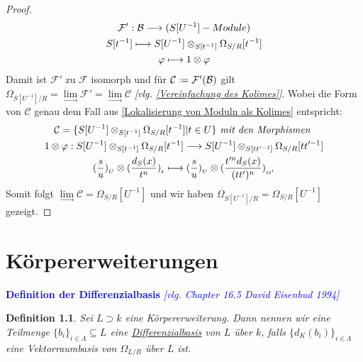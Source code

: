 \documentclass[10pt,a4paper]{report}
\newcommand{\comment}[1]{}
\newcommand{\ModulsOfDifferenzials}{David Eisenbud 1994}
\newcounter{Aussage}[chapter]
\newtheorem{definition}[Aussage]{Definition}
\newcommand{\functionfront}[3]{\nolinebreak{#1:#2 \longrightarrow #3}}
\newcommand{\divR}[2]{\Omega_{#1/#2}}
\newcommand{\divf}[1]{d_{#1}}
\newcommand{\Tensor}[3]{#1 \otimes_{#2} #3}
\newcommand{\tensor}[3]{#1 \otimes #3}
\newcommand{\lok}[2]{#1 [#2^{-1}]}
\newcommand{\loke}[3]{(\frac{#1}{#2})_{_{#3}}}
\newcommand{\colimes}[0]{\lim\limits_{ \longrightarrow }}
\newcommand*{\defeq}{\mathrel{\vcenter{\baselineskip0.5ex \lineskiplimit0pt
                     \hbox{\scriptsize.}\hbox{\scriptsize.}}}%
                     =}
\begin{document}
\begin{proof}
{\begin{gather*}
\functionfront{\mathcal{F'}}{\mathcal{B}}{(\lok{S}{U} - Module)}\\
\lok{S}{t} \longmapsto \Tensor{\lok{S}{U}}{\lok{S}{t}}{\lok{\divR{S}{R}}{t}}\\
\varphi \longmapsto \tensor{1}{\lok{S}{t}}{\varphi}
\end{gather*}}
Damit ist $\mathcal{F'}$ zu $\mathcal{F}$ isomorph und für $\mathcal{C} \defeq \mathcal{F'}(\mathcal{B})$ gilt $\divR{\lok{S}{U}}{R}  = \colimes{\mathcal{F'}} = \colimes{\mathcal{C}}$ \textit{[vlg. \cref{Vereinfachung des Kolimes}]}.
Wobei die Form von $\mathcal{C}$ genau dem Fall aus \cref{Lokalisierung von Moduln als Kolimes} entspricht:
\begin{gather*}
\comment{\divR{\lok{S}{U}}{R}  = \colimes{\mathcal{C}} \text{, wobei:} \\}
\mathcal{C} = \lbrace \Tensor{\lok{S}{U}}{\lok{S}{t}}{\lok{\divR{S}{R}}{t}} \vert t \in U \rbrace \textit{ mit den Morphismen }\\
\functionfront{\tensor{1}{\lok{S}{t}}{\varphi}}{\Tensor{\lok{S}{U}}{\lok{S}{t}}{\lok{\divR{S}{R}}{t}}}{\Tensor{\lok{S}{U}}{\lok{S}{tt'}}{\lok{\divR{S}{R}}{tt'}}} \\
\tensor{\loke{s}{u}{U}}{\lok{S}{t}}{\loke{\divf{S}(x)}{t^n}{t}} \longmapsto \tensor{\loke{s}{u}{U}}{\lok{S}{tt'}}{\loke{t'^n\divf{S}(x)}{(tt')^n}{tt'}}
\end{gather*}
Somit folgt $\colimes \mathcal{C} = \lok{\divR{S}{R}}{U}$ und wir haben $\divR{\lok{S}{U}}{R} = \lok{\divR{S}{R}}{U}$ gezeigt.
\end{proof}


\chapter{Körpererweiterungen}

\textcolor{blue}{\textbf{Definition der Differenzialbasis} \textit{[vlg. Chapter 16.5 \ModulsOfDifferenzials]}}
\begin{definition}\comment{\label{Definition der Differenzialbasis}}
Sei $L \supset k$ eine Körpererweiterung. Dann nennen wir eine Teilmenge $\lbrace b_i \rbrace_{i \in \Lambda} \subseteq L$ eine \underline{Differenzialbasis} von $L$ über $k$, falls $\lbrace \divf{K}(b_i)\rbrace_{i \in \Lambda}$ eine Vektorraumbasis von $\divR{L}{R}$ über $L$ ist.
\end{definition}
\end{document}
